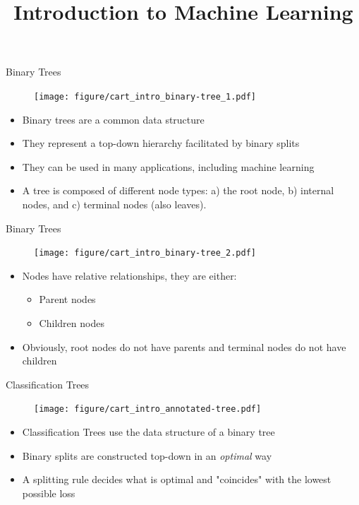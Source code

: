 \documentclass[11pt,compress,t,notes=noshow, xcolor=table]{beamer}
\title{Introduction to Machine Learning}
\institute{\href{https://compstat-lmu.github.io/lecture_i2ml/}{compstat-lmu.github.io/lecture\_i2ml}}
\date{}
\begin{document}
\sloppy

\begin{vbframe}{Binary Trees}
    \begin{figure}
    \centering
      \texttt{[image: figure/cart\_intro\_binary-tree\_1.pdf]}
    \end{figure}
  \begin{itemize}
    \item Binary trees are a common data structure
    \item They represent a top-down hierarchy facilitated by binary splits
    \item They can be used in many applications, including machine learning
    \item A tree is composed of different node types: a) the root node, b) internal nodes, and c) terminal nodes (also leaves).
  \end{itemize}
\end{vbframe}

\begin{vbframe}{Binary Trees}
    \begin{figure}
    \centering
      \texttt{[image: figure/cart\_intro\_binary-tree\_2.pdf]}
    \end{figure}
  \begin{itemize}
    \item Nodes have relative relationships, they are either:
    \begin{itemize}
    \item Parent nodes
    \item Children nodes
    \end{itemize}
    \item Obviously, root nodes do not have parents and terminal nodes do not have children
  \end{itemize}
\end{vbframe}

\begin{vbframe}{Classification Trees}
    \begin{figure}
    \centering
      \texttt{[image: figure/cart\_intro\_annotated-tree.pdf]}
    \end{figure}
  \begin{itemize}
    \item Classification Trees use the data structure of a binary tree
    \item Binary splits are constructed top-down in an \emph{optimal} way
    \item A splitting rule decides what is optimal and "coincides" with the lowest possible loss
  \end{itemize}
\end{vbframe}
\end{document}

